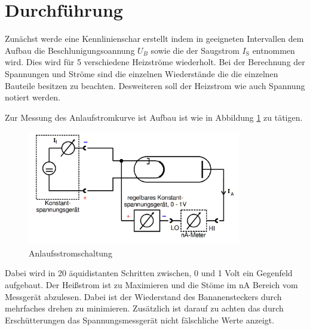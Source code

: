 \section{Durchführung}
\label{sec:Durchführung}
Zunächst werde eine Kennlinienschar erstellt indem in geeigneten Intervallen dem Aufbau die Beschlunigungsoannung $U_B$ sowie die der Saugstrom $I_\text{S}$ entnommen wird. Dies wird für 5 verschiedene Heizströme wiederholt. Bei der Berechnung der Spannungen und Ströme sind die einzelnen Wiederstände die die einzelnen Bauteile besitzen zu beachten. Desweiteren soll der Heizstrom wie auch Spannung notiert werden.

Zur Messung des Anlaufstromkurve ist Aufbau ist wie in Abbildung \ref{fig:Anl} zu tätigen. 
\begin{figure}
  \centering
  \includegraphics[height=5cm]{picture/Gegenfeld.png}
  \caption{Anlaufsstromschaltung \cite{pra}}
  \label{fig:Anl}
\end{figure}
Dabei wird in 20 äquidistanten Schritten zwischen, 0 und 1 Volt ein Gegenfeld aufgebaut. Der Heißstrom ist zu Maximieren und die Stöme im nA Bereich vom Messgerät abzulesen. Dabei ist der Wiederstand des Bananensteckers durch mehrfaches drehen zu minimieren. Zusätzlich ist darauf zu achten das durch Erschütterungen das Spannungsmessgerät nicht fälschliche Werte anzeigt. 
